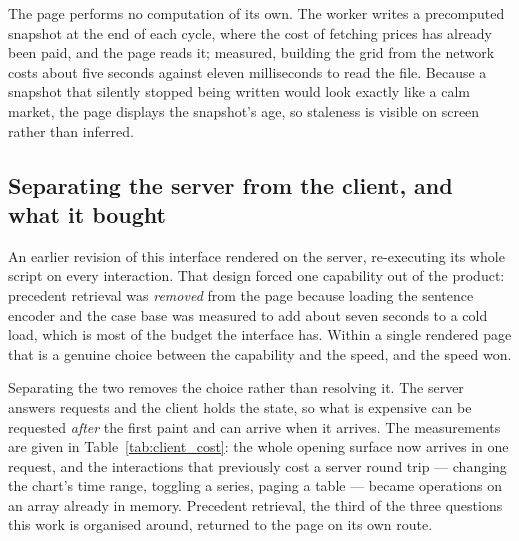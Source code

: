 The page performs no computation of its own. The worker writes a precomputed snapshot at the end of
each cycle, where the cost of fetching prices has already been paid, and the page reads it; measured,
building the grid from the network costs about five seconds against eleven milliseconds to read the
file. Because a snapshot that silently stopped being written would look exactly like a calm market,
the page displays the snapshot's age, so staleness is visible on screen rather than inferred.

\subsection{Separating the server from the client, and what it bought}
\label{sec:investigator_client}

An earlier revision of this interface rendered on the server, re-executing its whole script on every
interaction. That design forced one capability out of the product: precedent retrieval was
\emph{removed} from the page because loading the sentence encoder and the case base was measured to
add about seven seconds to a cold load, which is most of the budget the interface has. Within a
single rendered page that is a genuine choice between the capability and the speed, and the speed
won.

Separating the two removes the choice rather than resolving it. The server answers requests and the
client holds the state, so what is expensive can be requested \emph{after} the first paint and can
arrive when it arrives. The measurements are given in Table~\ref{tab:client_cost}: the whole opening
surface now arrives in one request, and the interactions that previously cost a server round trip ---
changing the chart's time range, toggling a series, paging a table --- became operations on an array
already in memory. Precedent retrieval, the third of the three questions this work is organised
around, returned to the page on its own route.

